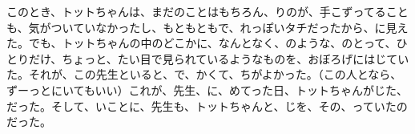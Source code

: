                                                                                                                                                                                                                                                                                                                                                                                                                                                                                                                                                                                                                                                                           このとき、トットちゃんは、まだのことはもちろん、りのが、手こずってることも、気がついていなかったし、もともともで、れっぽいタチだったから、に見えた。でも、トットちゃんの中のどこかに、なんとなく、のような、のとって、ひとりだけ、ちょっと、たい目で見られているようなものを、おぼろげにはじていた。それが、この先生といると、で、かくて、ちがよかった。（この人となら、ずーっとにいてもいい）これが、先生、に、めてった日、トットちゃんがじた、だった。そして、いことに、先生も、トットちゃんと、じを、その、っていたのだった。


